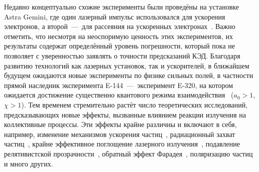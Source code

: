 Недавно концептуально схожие  эксперименты были проведёны на установке Astra Gemini, где один лазерный импульс использовался для ускорения электронов, а второй~---~для рассеяния на ускоренных электронах~\cite{Poder17, Cole17}.
Важно отметить, что несмотря на неоспоримую ценность этих экспериментов, их результаты содержат определённый уровень погрешности, который пока не позволяет с уверенностью заявлять о точности предсказаний КЭД.
Благодаря развитию технологий как лазерных установок, так и ускорителей, в ближайшем будущем ожидаются новые эксперименты по физике сильных полей, в частности прямой наследник эксперимента E-144~---~эксперимент E-320, на котором ожидается достижение существенно квантового режима взаимодействия~\cite{meuren2019probing} ($a_0 > 1$, $\chi > 1$).
Тем временем стремительно растёт число теоретических исследований, предсказывающих новые эффекты, вызванные влиянием реакции излучения на коллективные процессы.
Эти эффекты крайне различны и включают в себя, например, изменение механизмов ускорения частиц~\cite{Tamburini10, Tamburini12, kostyukov2012radiative, Capdessus12, Capdessus15, Nerush15, Gelfer18a, Gelfer18b, gelfer2021ions, golovanov2021radiation},
радиационный захват частиц~\cite{Gonoskov14, Ji14b, zhu2015enhanced, kirk2016radiative, vranic2018extremely, gong2019radiation}, 
крайне эффективное поглощение лазерного излучения~\cite{grismayer2016laser},
подавление релятивистской прозрачности~\cite{Zhang15, serebryakov2022opacity},
обратный эффект Фарадея~\cite{Liseykina16,liseykina2021IFE},
поляризацию частиц~\cite{DelSorbo2017Spin,DelSorbo2018spin,Chen2019spin,Seipt2019spin,Wu2019spin,li2019ultrarelativistic,Li2020spin,Wan2020spin,gong2021retrieving} и много других.

